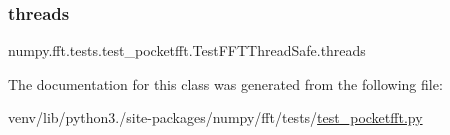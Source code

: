 \subsubsection{\texorpdfstring{threads}{threads}}
{\footnotesize\ttfamily numpy.\+fft.\+tests.\+test\+\_\+pocketfft.\+Test\+F\+F\+T\+Thread\+Safe.\+threads\hspace{0.3cm}{\ttfamily [static]}}



The documentation for this class was generated from the following file\+:\begin{DoxyCompactItemize}
\item 
venv/lib/python3./site-\/packages/numpy/fft/tests/\hyperlink{test__pocketfft_8py}{test\+\_\+pocketfft.\+py}\end{DoxyCompactItemize}
